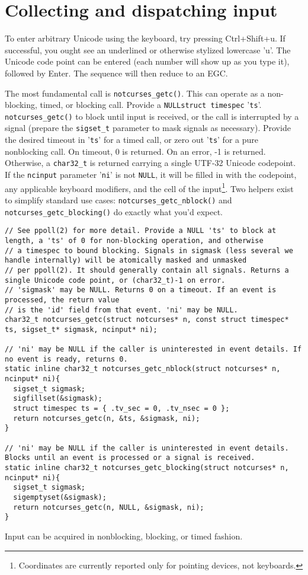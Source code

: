 \section{Collecting and dispatching input}
\label{sec:input}

To enter arbitrary Unicode using the keyboard, try pressing Ctrl+Shift+u. If
successful, you ought see an underlined or otherwise stylized lowercase 'u'.
The Unicode code point can be entered (each number will show up as you type it),
followed by Enter. The sequence will then reduce to an EGC.

The most fundamental call is \texttt{notcurses\_getc()}. This can operate as a
non-blocking, timed, or blocking call. Provide a \texttt{NULL}\texttt{struct timespec} '\texttt{ts}'.
\texttt{notcurses\_getc()} to block until input is received, or the call is
interrupted by a signal (prepare the \texttt{sigset\_t} parameter to mask signals
as necessary). Provide the desired timeout in '\texttt{ts}' for a timed call,
or zero out '\texttt{ts}' for a pure nonblocking call. On timeout, 0 is returned.
On an error, -1 is returned. Otherwise, a \texttt{char32\_t} is returned carrying
a single UTF-32 Unicode codepoint. If the \texttt{ncinput} parameter '\texttt{ni}'
is not \texttt{NULL}, it will be filled in with the codepoint, any applicable
keyboard modifiers, and the cell of the input\footnote{Coordinates are currently
reported only for pointing devices, not keyboards.}. Two helpers exist to simplify
standard use cases: \texttt{notcurses\_getc\_nblock()} and \texttt{notcurses\_getc\_blocking()}
do exactly what you'd expect.

\begin{listing}[!htb]
\begin{verbatim}
// See ppoll(2) for more detail. Provide a NULL 'ts' to block at length, a 'ts' of 0 for non-blocking operation, and otherwise
// a timespec to bound blocking. Signals in sigmask (less several we handle internally) will be atomically masked and unmasked
// per ppoll(2). It should generally contain all signals. Returns a single Unicode code point, or (char32_t)-1 on error.
// 'sigmask' may be NULL. Returns 0 on a timeout. If an event is processed, the return value
// is the 'id' field from that event. 'ni' may be NULL.
char32_t notcurses_getc(struct notcurses* n, const struct timespec* ts, sigset_t* sigmask, ncinput* ni);

// 'ni' may be NULL if the caller is uninterested in event details. If no event is ready, returns 0.
static inline char32_t notcurses_getc_nblock(struct notcurses* n, ncinput* ni){
  sigset_t sigmask;
  sigfillset(&sigmask);
  struct timespec ts = { .tv_sec = 0, .tv_nsec = 0 };
  return notcurses_getc(n, &ts, &sigmask, ni);
}

// 'ni' may be NULL if the caller is uninterested in event details. Blocks until an event is processed or a signal is received.
static inline char32_t notcurses_getc_blocking(struct notcurses* n, ncinput* ni){
  sigset_t sigmask;
  sigemptyset(&sigmask);
  return notcurses_getc(n, NULL, &sigmask, ni);
}
\end{verbatim}
\caption{Input can be acquired in nonblocking, blocking, or timed fashion.}
\label{listing:input}
\end{listing}


